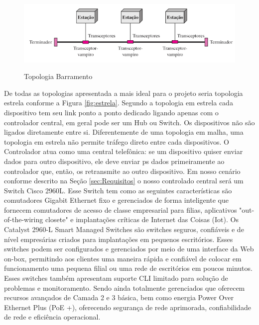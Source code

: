 \documentclass[	DIV=calc,%
							paper=a4,%
							fontsize=12pt,%
							onecolumn]{scrartcl}	 					%
\begin{document}
\begin{figure}[!htbp]
	\centering
	\includegraphics[width=\textwidth]{./imagens/barramento.png}
	\caption{Topologia Barramento}
	\cite{forouzan2007}
	\label{fig:barramento}
\end{figure}

De todas as topologias apresentada a mais ideal para o projeto seria topologia estrela conforme a Figura \ref{fig:estrela}. Segundo \cite{forouzan2007} a topologia em estrela cada dispositivo tem seu link ponto a ponto dedicado ligando apenas com o controlador central, em geral pode ser um Hub ou Switch. Os dispositivos não são ligados diretamente entre si. Diferentemente de uma topologia em malha, uma topologia em estrela não permite tráfego direto entre cada dispositivos. O Controlador atua como uma central telefônica: se um dispositivo quiser enviar dados para outro dispositivo, ele deve enviar ps dados primeiramente ao controlador que, então, os retransmite ao outro dispositivo. Em nosso cenário conforme descrito na Seção \ref{sec:Requisitos} o nosso controlado central será um Switch Cisco 2960L.
Esse Switch tem como as seguintes características são comutadores Gigabit Ethernet fixo e gerenciados de forma inteligente que fornecem comutadores de acesso de classe empresarial para filias, aplicativos "out-of-the-wiring closete" e implantações críticas de Internet das Coisas (Iot). Os Catalyst 2960-L Smart Managed Switches são switches seguros, confiáveis e de nível empresárias criados para implantações em pequenos escritórios. Esses switches podem ser configurados e gerenciados por meio de uma interface da Web on-box, permitindo aos clientes uma maneira rápida e confiável de colocar em funcionamento uma pequena filial ou uma rede de escritórios em poucos minutos. Esses switches também apresentam suporte CLI limitado para solução de problemas e monitoramento. Sendo ainda totalmente gerenciados que oferecem recursos avançados de Camada 2 e 3 básica, bem como energia Power Over Ethernet Plus (PoE +), oferecendo segurança de rede aprimorada, confiabilidade de rede e eficiência operacional. 
 	
\end{document}
